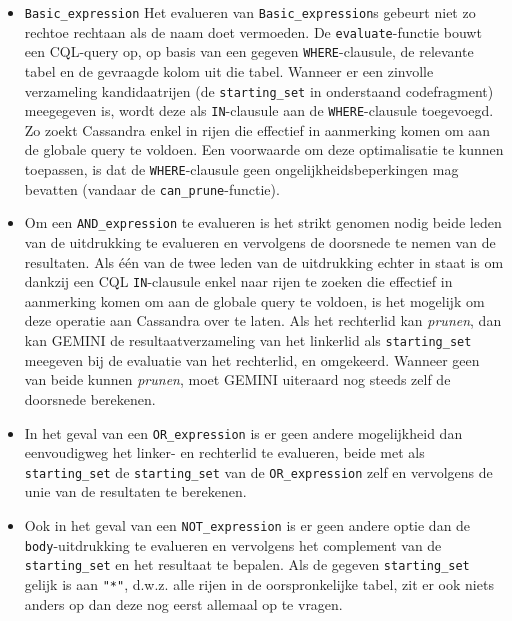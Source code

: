 \begin{itemize}
\item \texttt{Basic\_expression}
Het evalueren van \texttt{Basic\_expression}s gebeurt niet zo rechtoe rechtaan als de naam doet vermoeden. De \texttt{evaluate}-functie bouwt een CQL-query op, op basis van een gegeven \texttt{WHERE}-clausule, de relevante tabel en de gevraagde kolom uit die tabel. Wanneer er een zinvolle verzameling kandidaatrijen (de \texttt{starting\_set} in onderstaand codefragment) meegegeven is, wordt deze als \texttt{IN}-clausule aan de \texttt{WHERE}-clausule toegevoegd. Zo zoekt Cassandra enkel in rijen die effectief in aanmerking komen om aan de globale query te voldoen. Een voorwaarde om deze optimalisatie te kunnen toepassen, is dat de \texttt{WHERE}-clausule geen ongelijkheidsbeperkingen mag bevatten (vandaar de \texttt{can\_prune}-functie).




\item Om een \texttt{AND\_expression} te evalueren is het strikt genomen nodig beide leden van de uitdrukking te evalueren en vervolgens de doorsnede te nemen van de resultaten. Als \'e\'en van de twee leden van de uitdrukking echter in staat is om dankzij een CQL \texttt{IN}-clausule enkel naar rijen te zoeken die effectief in aanmerking komen om aan de globale query te voldoen, is het mogelijk om deze operatie aan Cassandra over te laten. Als het rechterlid kan \textit{prunen}, dan kan GEMINI de resultaatverzameling van het linkerlid als \texttt{starting\_set} meegeven bij de evaluatie van het rechterlid, en omgekeerd. Wanneer geen van beide kunnen \textit{prunen}, moet GEMINI uiteraard nog steeds zelf de doorsnede berekenen.




\item In het geval van een \texttt{OR\_expression} is er geen andere mogelijkheid dan eenvoudigweg het linker- en rechterlid te evalueren, beide met als \texttt{starting\_set} de \texttt{starting\_set} van de \texttt{OR\_expression} zelf en vervolgens de unie van de resultaten te berekenen.

\item Ook in het geval van een \texttt{NOT\_expression} is er geen andere optie dan de \texttt{body}-uitdrukking te evalueren en vervolgens het complement van de \texttt{starting\_set} en het resultaat te bepalen. Als de gegeven \texttt{starting\_set} gelijk is aan \texttt{"*"}, d.w.z. alle rijen in de oorspronkelijke tabel, zit er ook niets anders op dan deze nog eerst allemaal op te vragen.




\end{itemize}

